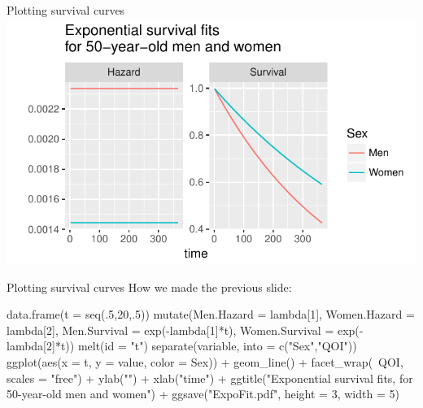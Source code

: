 \documentclass{beamer}
\newcommand\bblue[1]{{\color{blue}\textbf{#1}}}
\begin{document}
\begin{frame}{Plotting survival curves}
\centering
\includegraphics[width = \textwidth]{figs/ExpoFit.pdf}
\end{frame}

\begin{frame}[fragile]{Plotting survival curves}
How we made the previous slide:
\begin{scriptsize}
\begin{semiverbatim}
data.frame(t = seq(.5,20,.5)) %
  mutate(Men.Hazard = lambda[1],
         Women.Hazard = lambda[2],
         Men.Survival = exp(-lambda[1]*t),
         Women.Survival = exp(-lambda[2]*t)) %
  melt(id = "t") %
  separate(variable, into = c("Sex","QOI")) %
  ggplot(aes(x = t, y = value, color = Sex)) +
  geom_line() +
  facet_wrap(~QOI, scales = "free") + ylab("") + xlab("time") +
  ggtitle("Exponential survival fits, for 50-year-old men and women") +
  ggsave("ExpoFit.pdf",
         height = 3, width = 5)
\end{semiverbatim}
\end{scriptsize}
\end{frame}

\end{document}
